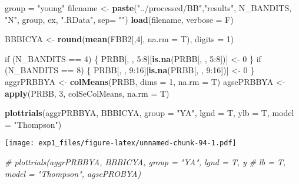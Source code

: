 \documentclass[11pt,,]{article}
\newenvironment{Shaded}{\begin{snugshade}}{\end{snugshade}}
\newcommand{\KeywordTok}[1]{\textcolor[rgb]{0.13,0.29,0.53}{\textbf{{#1}}}}
\newcommand{\DataTypeTok}[1]{\textcolor[rgb]{0.13,0.29,0.53}{{#1}}}
\newcommand{\DecValTok}[1]{\textcolor[rgb]{0.00,0.00,0.81}{{#1}}}
\newcommand{\StringTok}[1]{\textcolor[rgb]{0.31,0.60,0.02}{{#1}}}
\newcommand{\CommentTok}[1]{\textcolor[rgb]{0.56,0.35,0.01}{\textit{{#1}}}}
\newcommand{\NormalTok}[1]{{#1}}
\begin{document}
\begin{Shaded}
\begin{Highlighting}[]
\NormalTok{group =}\StringTok{ "young"}
\NormalTok{filename  <-}\StringTok{ }\KeywordTok{paste}\NormalTok{(}\StringTok{"../processed/BB"}\NormalTok{,}\StringTok{"results"}\NormalTok{, N_BANDITS, }\StringTok{"N"}\NormalTok{, }
                   \NormalTok{group, ex, }\StringTok{".RData"}\NormalTok{, }\DataTypeTok{sep=} \StringTok{""}\NormalTok{)}
\KeywordTok{load}\NormalTok{(filename, }\DataTypeTok{verbose =} \NormalTok{F)}

\NormalTok{BBBICYA <-}\StringTok{ }\KeywordTok{round}\NormalTok{(}\KeywordTok{mean}\NormalTok{(FBB2[,}\DecValTok{4}\NormalTok{], }\DataTypeTok{na.rm =} \NormalTok{T), }\DataTypeTok{digits =} \DecValTok{1}\NormalTok{)}

\NormalTok{if (N_BANDITS ==}\StringTok{ }\DecValTok{4}\NormalTok{) \{}
    \NormalTok{PRBB[, , }\DecValTok{5}\NormalTok{:}\DecValTok{8}\NormalTok{][}\KeywordTok{is.na}\NormalTok{(PRBB[, , }\DecValTok{5}\NormalTok{:}\DecValTok{8}\NormalTok{])] <-}\StringTok{ }\DecValTok{0}
\NormalTok{\}}
\NormalTok{if (N_BANDITS ==}\StringTok{ }\DecValTok{8}\NormalTok{) \{}
    \NormalTok{PRBB[, , }\DecValTok{9}\NormalTok{:}\DecValTok{16}\NormalTok{][}\KeywordTok{is.na}\NormalTok{(PRBB[, , }\DecValTok{9}\NormalTok{:}\DecValTok{16}\NormalTok{])] <-}\StringTok{ }\DecValTok{0}
\NormalTok{\}}
\NormalTok{aggrPRBBYA <-}\StringTok{ }\KeywordTok{colMeans}\NormalTok{(PRBB, }\DataTypeTok{dims =} \DecValTok{1}\NormalTok{, }\DataTypeTok{na.rm =} \NormalTok{T) }
\NormalTok{agsePRBBYA <-}\StringTok{ }\KeywordTok{apply}\NormalTok{(PRBB, }\DecValTok{3}\NormalTok{, colSeColMeans, }\DataTypeTok{na.rm =} \NormalTok{T) }
\end{Highlighting}
\end{Shaded}

\begin{Shaded}
\begin{Highlighting}[]
\KeywordTok{plottrials}\NormalTok{(aggrPRBBYA, BBBICYA, }\DataTypeTok{group =} \StringTok{"YA"}\NormalTok{, }\DataTypeTok{lgnd =} \NormalTok{T, }\DataTypeTok{ylb =} \NormalTok{T, }\DataTypeTok{model =} \StringTok{"Thompson"}\NormalTok{)}
\end{Highlighting}
\end{Shaded}

\texttt{[image: exp1\_files/figure-latex/unnamed-chunk-94-1.pdf]}

\begin{Shaded}
\begin{Highlighting}[]
\CommentTok{# plottrials(aggrPRBBYA, BBBICYA, group = "YA", lgnd = T, y}
           \CommentTok{# lb = T, model = "Thompson", agsePROBYA)}
\end{Highlighting}
\end{Shaded}
\end{document}
